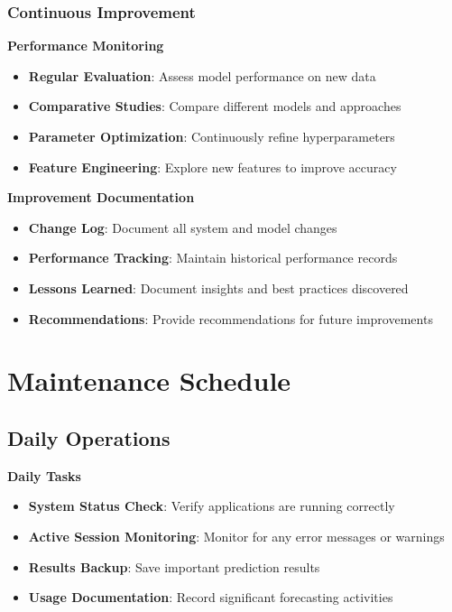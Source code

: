 \subsubsection{Continuous Improvement}

\textbf{Performance Monitoring}
\begin{itemize}
	\item \textbf{Regular Evaluation}: Assess model performance on new data
	\item \textbf{Comparative Studies}: Compare different models and approaches
	\item \textbf{Parameter Optimization}: Continuously refine hyperparameters
	\item \textbf{Feature Engineering}: Explore new features to improve accuracy
\end{itemize}

\textbf{Improvement Documentation}
\begin{itemize}
	\item \textbf{Change Log}: Document all system and model changes
	\item \textbf{Performance Tracking}: Maintain historical performance records
	\item \textbf{Lessons Learned}: Document insights and best practices discovered
	\item \textbf{Recommendations}: Provide recommendations for future improvements
\end{itemize}

\section{Maintenance Schedule}

\subsection{Daily Operations}

\textbf{Daily Tasks}
\begin{itemize}
	\item \textbf{System Status Check}: Verify applications are running correctly
	\item \textbf{Active Session Monitoring}: Monitor for any error messages or warnings
	\item \textbf{Results Backup}: Save important prediction results
	\item \textbf{Usage Documentation}: Record significant forecasting activities
\end{itemize}

